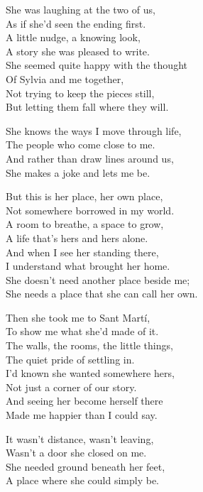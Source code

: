 \begin{lyrics}
She was laughing at the two of us,\\
As if she'd seen the ending first.\\
A little nudge, a knowing look,\\
A story she was pleased to write.\\
She seemed quite happy with the thought\\
Of Sylvia and me together,\\
Not trying to keep the pieces still,\\
But letting them fall where they will.

She knows the ways I move through life,\\
The people who come close to me.\\
And rather than draw lines around us,\\
She makes a joke and lets me be.

But this is her place, her own place,\\
Not somewhere borrowed in my world.\\
A room to breathe, a space to grow,\\
A life that's hers and hers alone.\\
And when I see her standing there,\\
I understand what brought her home.\\
She doesn't need another place beside me;\\
She needs a place that she can call her own.

Then she took me to Sant Martí,\\
To show me what she'd made of it.\\
The walls, the rooms, the little things,\\
The quiet pride of settling in.\\
I'd known she wanted somewhere hers,\\
Not just a corner of our story.\\
And seeing her become herself there\\
Made me happier than I could say.

It wasn't distance, wasn't leaving,\\
Wasn't a door she closed on me.\\
She needed ground beneath her feet,\\
A place where she could simply be.


\end{lyrics}
